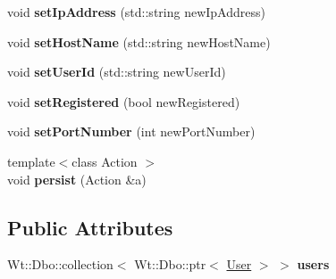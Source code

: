 \begin{DoxyCompactItemize}
\item 
void {\bfseries set\+Ip\+Address} (std\+::string new\+Ip\+Address)\hypertarget{classBridge_aa4fd7375d4b6092ca8bbee093dcc1a27}{}\label{classBridge_aa4fd7375d4b6092ca8bbee093dcc1a27}

\item 
void {\bfseries set\+Host\+Name} (std\+::string new\+Host\+Name)\hypertarget{classBridge_a1a5adca21bbdcdfe78fdd1e2f925d8c2}{}\label{classBridge_a1a5adca21bbdcdfe78fdd1e2f925d8c2}

\item 
void {\bfseries set\+User\+Id} (std\+::string new\+User\+Id)\hypertarget{classBridge_a2a68458da56a25afbbe4a8a108eb2f01}{}\label{classBridge_a2a68458da56a25afbbe4a8a108eb2f01}

\item 
void {\bfseries set\+Registered} (bool new\+Registered)\hypertarget{classBridge_ac912eac357647d47bc87052da93c45e9}{}\label{classBridge_ac912eac357647d47bc87052da93c45e9}

\item 
void {\bfseries set\+Port\+Number} (int new\+Port\+Number)\hypertarget{classBridge_a0acefccf95c0bf57465241ffe9618491}{}\label{classBridge_a0acefccf95c0bf57465241ffe9618491}

\item 
{\footnotesize template$<$class Action $>$ }\\void {\bfseries persist} (Action \&a)\hypertarget{classBridge_a20b4d278bc879a5c647e106e03fa1cdc}{}\label{classBridge_a20b4d278bc879a5c647e106e03fa1cdc}

\end{DoxyCompactItemize}
\subsection*{Public Attributes}
\begin{DoxyCompactItemize}
\item 
Wt\+::\+Dbo\+::collection$<$ Wt\+::\+Dbo\+::ptr$<$ \hyperlink{classUser}{User} $>$ $>$ {\bfseries users}\hypertarget{classBridge_a84dbab519260e2e4edd8d40803b1ceec}{}\label{classBridge_a84dbab519260e2e4edd8d40803b1ceec}

\end{DoxyCompactItemize}
